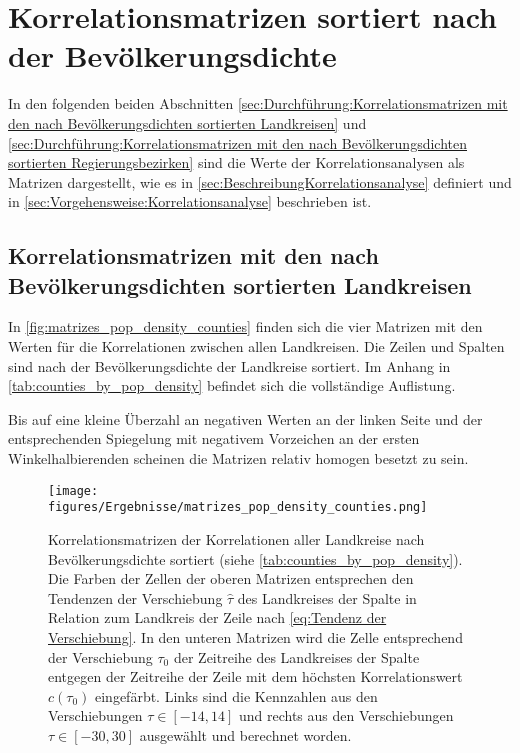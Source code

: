 \newpage
\section{Korrelationsmatrizen sortiert nach der Bevölkerungsdichte}\label{sec:Durchführung:Korrelationsmatrizen sortiert nach der Bevölkerungsdichte}
In den folgenden beiden Abschnitten \autoref{sec:Durchführung:Korrelationsmatrizen mit den nach Bevölkerungsdichten sortierten Landkreisen} und \autoref{sec:Durchführung:Korrelationsmatrizen mit den nach Bevölkerungsdichten sortierten Regierungsbezirken} sind die Werte der Korrelationsanalysen als Matrizen dargestellt, wie es in \autoref{sec:BeschreibungKorrelationsanalyse} definiert und in \autoref{sec:Vorgehensweise:Korrelationsanalyse} beschrieben ist.
\subsection{Korrelationsmatrizen mit den nach Bevölkerungsdichten sortierten Landkreisen}\label{sec:Durchführung:Korrelationsmatrizen mit den nach Bevölkerungsdichten sortierten Landkreisen}
In \autoref{fig:matrizes_pop_density_counties} finden sich die vier Matrizen mit den Werten für die Korrelationen zwischen allen Landkreisen. Die Zeilen und Spalten sind nach der Bevölkerungsdichte der Landkreise sortiert. Im Anhang in \autoref{tab:counties_by_pop_density} befindet sich die vollständige Auflistung.

Bis auf eine kleine Überzahl an negativen Werten an der linken Seite und der entsprechenden Spiegelung mit negativem Vorzeichen an der ersten Winkelhalbierenden scheinen die Matrizen relativ homogen besetzt zu sein.

\begin{figure}[H]
    \centering
    \texttt{[image: figures/Ergebnisse/matrizes\_pop\_density\_counties.png]}
    \caption{Korrelationsmatrizen der Korrelationen aller Landkreise nach Bevölkerungsdichte sortiert (siehe \autoref{tab:counties_by_pop_density}). Die Farben der Zellen der oberen Matrizen entsprechen den Tendenzen der Verschiebung $\hat{\tau}$ des Landkreises der Spalte in Relation zum Landkreis der Zeile nach \autoref{eq:Tendenz der Verschiebung}. 
    In den unteren Matrizen wird die Zelle entsprechend der Verschiebung $\tau_0$ der Zeitreihe des Landkreises der Spalte entgegen der Zeitreihe der Zeile mit dem höchsten Korrelationswert $c(\tau_0)$ eingefärbt. Links sind die Kennzahlen aus den Verschiebungen $\tau\in[-14,14]$ und rechts aus den Verschiebungen $\tau\in[-30,30]$ ausgewählt und berechnet worden.}
    \label{fig:matrizes_pop_density_counties}
\end{figure}
